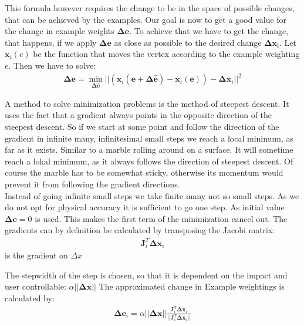 This formula however requires the change to be in the space of possible changes, that can be achieved by the examples. Our goal is now to get a good value for the change in example weights $\bm{\Delta e}$. To achieve that we have to get the change, that happens, if we apply $\bm{\Delta e}$ as close as possible to the desired change $\bm{\Delta x_i}$. Let $\bm x_i(e)$ be the function that moves the vertex according to the example weighting $e$. Then we have to solve:
\begin{align}
\bm{\Delta e} = \min_{\bm{\Delta \hat e}}||(\bm x_i (\bm e + \bm{\Delta \hat e}) -\bm x_i (\bm e )) - \bm{\Delta x}_i ||^2
\end{align}

A method to solve minimization problems is the method of steepest descent. It uses the fact that a gradient always points in the opposite direction of the steepest descent. So if we start at some point and follow the direction of the gradient in infinite many, infinitesimal small steps we reach a local minimum, as far as it exists. Similar to a marble rolling around on a surface. It will sometime reach a lokal minimum, as it always follows the direction of steepest descent. Of course the marble has to be somewhat sticky, otherwise its momentum would prevent it from following the gradient directions.\\
Instead of going infinite small steps we take finite many not so small steps.
As we do not opt for physical accuracy it is sufficient to go one step. As initial value $\bm{\Delta e} = 0$ is used. This makes the first term of the minimization cancel out. The gradients can by definition be calculated by transposing the Jacobi matrix:
\begin{align}
\bm J_i^T \bm{\Delta x}_i
\end{align}
is the gradient on $\Delta x$

The stepwidth of the step is chosen, so that it is dependent on the impact and user controllable: $\alpha ||\bm{\Delta x}||$
The approximated change in Example weightings is calculated by:
\begin{align}
\bm{\Delta e}_i = \alpha ||\bm{\Delta x}|| \frac{\bm J_i^T \bm{\Delta x}_i}{||\bm J_i^T \bm{\Delta x}_i||}
\end{align}

